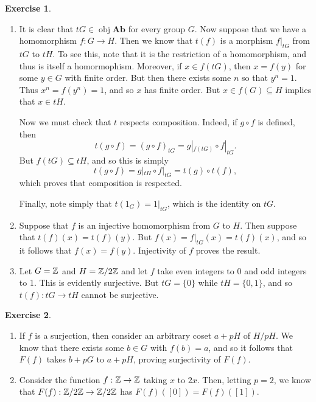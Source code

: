 \documentclass{article}
\theoremstyle{definition}
\newtheorem{intex}{Exercise}[section]
\newenvironment{exercise}{\begin{intex}\label{\theintex}}{\end{intex}}
\DeclareMathOperator\obj{obj}
\newcommand*\Cat[1]{\textbf{#1}}
\begin{document}
\begin{exercise} \leavevmode 
\begin{enumerate} 
\item It is clear that $tG\in\obj\Cat{Ab}$ for every group $G$. Now suppose that we have a homomorphism $f:G\to H$. Then we know that $t(f)$ is a morphism $f|_{tG}$ from $tG$ to $tH$. To see this, note that it is the restriction of a homomorphism, and thus is itself a homormophism. Moreover, if $x\in f(tG)$, then $x=f(y)$ for some $y\in G$ with finite order. But then there exists some $n$ so that $y^n=1$. Thus $x^n=f(y^n)=1$, and so $x$ has finite order. But $x\in f(G)\subseteq H$ implies that $x\in tH$. 

Now we must check that $t$ respects composition. Indeed, if $g\circ f$ is defined, then \[t(g\circ f)=(g\circ f)_{tG}=g|_{f(tG)}\circ f|_{tG}.\] But $f(tG)\subseteq tH$, and so this is simply \[t(g\circ f)=g|_{tH}\circ f|_{tG}=t(g)\circ t(f),\] which proves that composition is respected. 

Finally, note simply that $t(1_G)=1|_{tG}$, which is the identity on $tG$. 

\item Suppose that $f$ is an injective homomorphism from $G$ to $H$. Then suppose that $t(f)(x)=t(f)(y)$. But $f(x)=f|_{tG}(x)=t(f)(x)$, and so it follows that $f(x)=f(y)$. Injectivity of $f$ proves the result. 

\item Let $G=\mathbb{Z}$ and $H=\mathbb{Z}/2\mathbb{Z}$ and let $f$ take even integers to 0 and odd integers to 1. This is evidently surjective. But $tG=\{0\}$ while $tH=\{0,1\}$, and so $t(f):tG\to tH$ cannot be surjective. 
\end{enumerate}
\end{exercise} 

\begin{exercise} \leavevmode 
\begin{enumerate}
\item If $f$ is a surjection, then consider an arbitrary coset $a+pH$ of $H/pH$. We know that there exists some $b\in G$ with $f(b)=a$, and so it follows that $F(f)$ takes $b+pG$ to $a+pH$, proving surjectivity of $F(f)$. 

\item Consider the function $f:\mathbb{Z}\to\mathbb{Z}$ taking $x$ to $2x$. Then, letting $p=2$, we know that $F(f):\mathbb{Z}/2\mathbb{Z}\to\mathbb{Z}/2\mathbb{Z}$ has $F(f)([0])=F(f)([1])$. 
\end{enumerate}
\end{exercise} 
\end{document}
